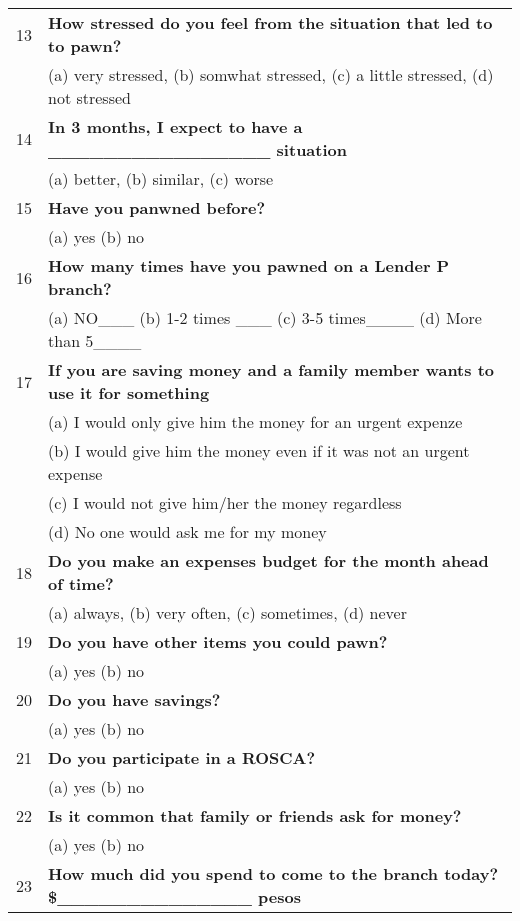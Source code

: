 \begin{tabular}{cl}
13    & \textbf{How stressed do you feel from the situation that led to to pawn?} \\
      & (a) very stressed, (b) somwhat stressed, (c) a little stressed, (d) not stressed  \\
14    & \textbf{In 3 months, I expect to have a  \_\_\_\_\_\_\_\_\_\_\_\_\_\_\_\_ situation} \\
      & (a) better, (b) similar,  (c) worse \\
15    & \textbf{Have you panwned before?} \\
      & (a) yes  (b) no \\
16    & \textbf{How many times have you pawned on a Lender P branch?} \\
      & (a) NO\_\_\_    (b)  1-2 times \_\_\_    (c) 3-5 times\_\_\_\_   (d) More than 5\_\_\_\_ \\
17    & \multicolumn{1}{p{54.91em}}{\textbf{If you are saving money and a family member wants to use it for something }} \\
      & \multicolumn{1}{p{54.91em}}{(a) I would only give him the money for an urgent expenze} \\
      & \multicolumn{1}{p{54.91em}}{(b) I would give him the money even if it was not an urgent expense} \\
      & \multicolumn{1}{p{54.91em}}{(c) I would not give him/her the money regardless} \\
      & \multicolumn{1}{p{54.91em}}{(d) No one would ask me for my money} \\
18    & \textbf{Do you make an expenses budget for the month ahead of time?} \\
      & (a) always, (b) very often, (c) sometimes, (d) never \\
19    & \multicolumn{1}{p{54.91em}}{\textbf{Do you have other items you could pawn?}} \\
      & (a) yes  (b) no \\
20    & \textbf{Do you have savings?} \\
      & (a) yes  (b) no \\
21    & \textbf{Do you participate in a ROSCA?} \\
      & (a) yes  (b) no \\
22    & \textbf{Is it common that family or friends ask for money?} \\
      & (a) yes  (b) no \\
23    & \textbf{How much did you spend to come to the branch today?    \$\_\_\_\_\_\_\_\_\_\_\_\_\_\_ pesos} \\

\end{tabular}
